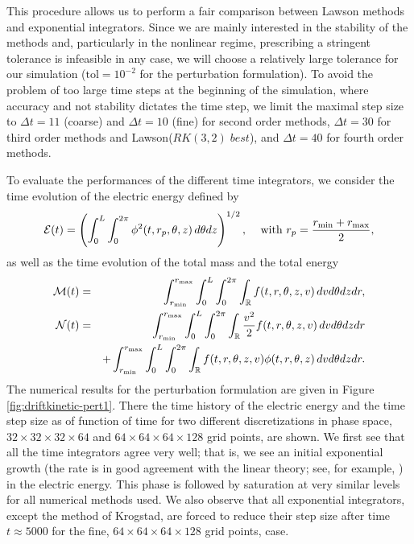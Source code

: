 This procedure allows us to perform a fair comparison between Lawson methods and exponential integrators. Since we are mainly interested in the stability of the methods and, particularly in the nonlinear regime, prescribing a stringent tolerance is infeasible in any case, we will choose a relatively large tolerance for our simulation ($\text{tol}=10^{-2}$ for the perturbation formulation). To avoid the problem of too large time steps at the beginning of the simulation, where accuracy and not stability dictates the time step, we limit the maximal step size to 
$\Delta t=11$ (coarse) and $\Delta t=10$ (fine) for second order methods, $\Delta t=30$ for third order methods and Lawson($RK(3, 2) \; best$), 
and $\Delta t=40$ for fourth order methods.

To evaluate the performances of the different time integrators, we consider the time evolution of the electric energy defined by
$$
{\cal E}(t) = \left( \int_{0}^{L} \int_0^{2\pi} \phi^2(t, r_p, \theta, z ) \,d\theta dz \right)^{1/2}, \;\;\; \mbox{ with } r_p=\frac{r_{\min}+r_{\max}}{2}, 
$$
as well as the time evolution of the total mass and the total energy 
\begin{eqnarray*}
{\cal M}(t) &=& \int_{r_{\min}}^{r_{\max}} \int_{0}^{L} \int_0^{2\pi} \int_{\mathbb R} f(t, r, \theta, z, v ) \,dv d\theta dz dr, \nonumber\\ 
{\cal N}(t) &=&\int_{r_{\min}}^{r_{\max}} \int_{0}^{L} \int_0^{2\pi} \int_{\mathbb R} \frac{v^2}{2} f(t, r, \theta, z, v ) \,dv d\theta dz dr \nonumber\\ 
&& + \int_{r_{\min}}^{r_{\max}} \int_{0}^{L} \int_0^{2\pi} \int_{\mathbb R} f(t, r, \theta, z, v )\phi(t, r, \theta, z) \,dv d\theta dz dr. 
\end{eqnarray*}
The numerical results for the perturbation formulation are given in Figure \ref{fig:driftkinetic-pert1}. There
the time history of the electric energy and the time step size as of function of time for two different 
discretizations in phase space, $32 \times 32 \times 32 \times 64$ and  $64 \times 64 \times 64 \times 128$ grid points, are shown. 
We first see that all the time integrators agree very well; that is, we see an initial exponential growth (the rate is in good agreement with the linear theory; see, for example, \cite{BC2013}) 
in the electric energy. This phase is followed by saturation at very similar levels for all numerical methods used. 
We also observe that all exponential integrators, except the method of Krogstad, are forced to reduce their step size after time $t\approx 5000$ for the fine, \ie $64\times 64 \times 64 \times 128$ grid points, case. 
